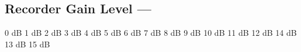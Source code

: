 \subsection[Recorder Gain Level]{Recorder Gain Level --- \UiKey{\SET}}









































0 dB
1 dB
2 dB
3 dB
4 dB
5 dB
6 dB
7 dB
8 dB
9 dB
10 dB
11 dB
12 dB
14 dB
13 dB
15 dB
